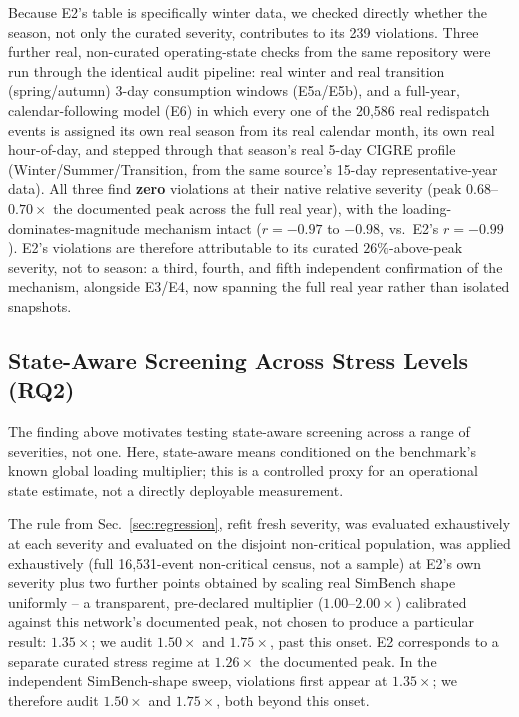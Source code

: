 \documentclass[11pt,conference]{IEEEtran}
\begin{document}
Because E2's table is specifically winter data, we checked directly whether the season, not only
the curated severity, contributes to its 239 violations. Three further real, non-curated
operating-state checks from the same repository \cite{ref:carlosgs2020} were run through the
identical audit pipeline: real winter and real transition (spring/autumn) 3-day consumption windows
(E5a/E5b), and a full-year, calendar-following model (E6) in which every one of the 20,586 real
redispatch events is assigned its own real season from its real calendar month, its own real
hour-of-day, and stepped through that season's real 5-day CIGRE profile (Winter/Summer/Transition,
from the same source's 15-day representative-year data). All three find \textbf{zero} violations at
their native relative severity (peak $0.68$--$0.70\times$ the documented peak across the full real
year), with the loading-dominates-magnitude mechanism intact ($r=-0.97$ to $-0.98$, vs.\ E2's
$r=-0.99$). E2's violations are therefore attributable to its curated $26\%$-above-peak severity, not
to season: a third, fourth, and fifth independent confirmation of the mechanism, alongside E3/E4, now
spanning the full real year rather than isolated snapshots.

\subsection{State-Aware Screening Across Stress Levels (RQ2)}
\label{sec:sensitivity}
The finding above motivates testing state-aware screening across a range of severities, not one.
Here, state-aware means conditioned on the benchmark's known global loading multiplier; this is a
controlled proxy for an operational state estimate, not a directly deployable measurement.

The rule from Sec.~\ref{sec:regression}, refit fresh %
severity, was evaluated exhaustively at each severity and evaluated on the disjoint non-critical
population, was applied exhaustively (full 16,531-event non-critical census, not a sample) at E2's
own severity plus two further points obtained by scaling real SimBench shape uniformly -- a
transparent, pre-declared multiplier ($1.00$--$2.00\times$) calibrated against this network's
documented peak, not chosen to produce a particular result: %
$1.35\times$; we audit $1.50\times$ and $1.75\times$, past this onset. E2 corresponds to a separate
curated stress regime at $1.26\times$ the documented peak. In the independent SimBench-shape sweep,
violations first appear at $1.35\times$; we therefore audit $1.50\times$ and $1.75\times$, both
beyond this onset.
\end{document}
